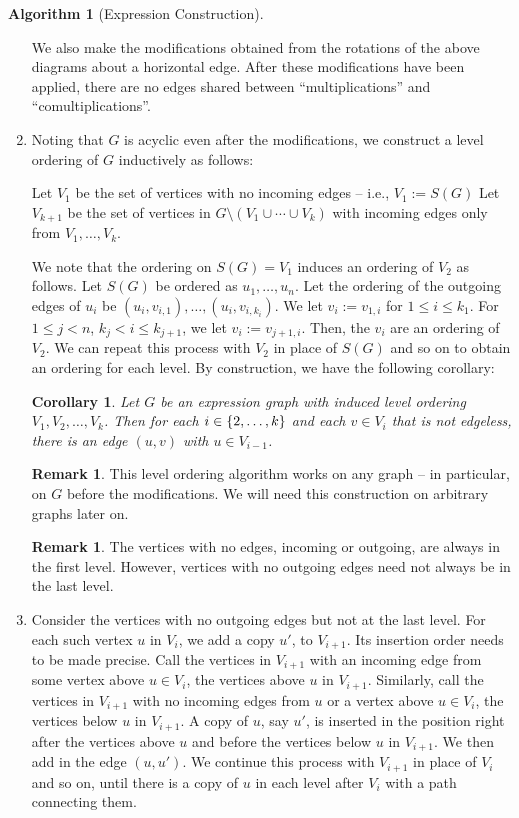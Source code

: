 \documentclass{amsart}
\newcommand{\curly}[1]{\left\{ #1 \right\}}
\newcommand{\set}[2][]{\ifthenelse{\equal{#1}{}}
                                  {\curly{#2}}
                                  {\curly{#1\ \textbf{:}\ #2}}}
\newcommand{\li}[1][]{\ifthenelse{\equal{#1}{}}{\item}{\item \label{#1}}}
\newenvironment{enmrt}{
  \enumerate[(i)]
  \setlength{\itemsep}{0pt}
}{
  \endenumerate
}
\numberwithin{thm}{section}
\newtheorem{cor}[thm]{Corollary}
\theoremstyle{definition}
\newtheorem{rmk}[thm]{Remark}
\newtheorem{alg}[thm]{Algorithm}
\begin{document}
\begin{alg}[Expression Construction]
\begin{enumerate}
We also make the modifications obtained from the rotations of the above diagrams
about a horizontal edge. After these modifications have been applied, there are
no edges shared between ``multiplications'' and ``comultiplications''.

\item Noting that $G$ is acyclic even after the modifications, we construct a
level ordering of $G$ inductively as follows:
\begin{enmrt}
\li Let $V_1$ be the set of vertices with no incoming edges -- i.e.,
$V_1 := S(G)$
\li Let $V_{k + 1}$ be the set of vertices in
$G \setminus (V_1 \cup \cdots \cup V_k)$ with incoming edges only from
$V_1, \dots, V_k$.
\end{enmrt}
We note that the ordering on $S(G) = V_1$ induces an ordering of $V_2$ as
follows. Let $S(G)$ be ordered as $u_1, \dots, u_n$. Let the ordering of the
outgoing edges of $u_i$ be $(u_i, v_{i, 1}), \dots, (u_i, v_{i, k_i})$. We let
$v_i := v_{1, i}$ for $1 \leq i \leq k_1$. For $1 \leq j < n$,
$k_j < i \leq k_{j + 1}$, we let $v_i := v_{j + 1, i}$. Then, the $v_i$ are an
ordering of $V_2$. We can repeat this process with $V_2$ in place of $S(G)$ and
so on to obtain an ordering for each level. By construction, we have the
following corollary:

\begin{cor}\label{cor:lvltolvl}
Let $G$ be an expression graph with induced level ordering
$V_1, V_2, \dots, V_k$. Then for each $i \in \set{2, \dots, k}$ and each
$v \in V_i$ that is not edgeless, there is an edge $(u, v)$ with
$u \in V_{i - 1}$.
\end{cor}

\begin{rmk}
This level ordering algorithm works on any graph -- in particular, on $G$
before the modifications. We will need this construction on arbitrary graphs
later on.
\end{rmk}

\begin{rmk}
The vertices with no edges, incoming or outgoing, are always in the first level.
However, vertices with no outgoing edges need not always be in the last level.
\end{rmk}

\item\label{alg:edgeless}
Consider the vertices with no outgoing edges but not at the last level. For each
such vertex $u$ in $V_i$, we add a copy $u'$, to $V_{i + 1}$. Its insertion
order needs to be made precise. Call the vertices in $V_{i + 1}$ with an
incoming edge from some vertex above $u \in V_{i}$, the vertices above $u$ in
$V_{i + 1}$. Similarly, call the vertices in $V_{i + 1}$ with no incoming edges
from $u$ or a vertex above $u \in V_i$, the vertices below $u$ in $V_{i + 1}$.
A copy of $u$, say $u'$, is inserted
in the position right after the vertices above $u$ and before the vertices below
$u$ in $V_{i + 1}$. We then add in the edge $(u, u')$. We continue this process
with $V_{i + 1}$ in place of $V_i$ and so on, until there is a copy
of $u$ in each level after $V_i$ with a path connecting them.


\end{enumerate}
\end{alg}
\end{document}
